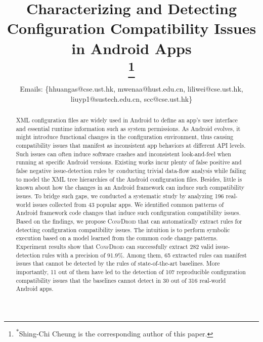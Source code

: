 \documentclass[conference,10pt]{IEEEtran}
\begin{document}
\title{Characterizing and Detecting Configuration Compatibility Issues in Android Apps\\
{}
\thanks{\textsuperscript{$*$}Shing-Chi Cheung is the corresponding author of this paper.}
}
\author{
	Emails: \{hhuangas@cse.ust.hk, mwenaa@hust.edu.cn, liliwei@cse.ust.hk, liuyp1@sustech.edu.cn, scc@cse.ust.hk\}
	}

\maketitle

\begin{abstract}

XML configuration files are widely used in Android to define an app's user interface and essential runtime information such as system permissions.
As Android evolves, it might introduce functional changes in the configuration environment, thus causing compatibility issues that manifest as inconsistent app behaviors at different API levels.
Such issues can often induce software crashes and inconsistent look-and-feel when running at specific Android versions.
Existing works incur plenty of false positive and false negative issue-detection rules by conducting trivial data-flow analysis while failing to model the XML tree hierarchies of the Android configuration files.
Besides, little is known about how the changes in an Android framework can induce such compatibility issues.
To bridge such gaps, we conducted a systematic study by analyzing 196 real-world issues collected from 43 popular apps.
We identified common patterns of Android framework code changes that induce such configuration compatibility issues.
Based on the findings, we propose \textsc{ConfDroid} that can automatically extract rules for detecting configuration compatibility issues.
The intuition is to perform symbolic execution based on a model learned from the common code change patterns.
Experiment results show that \textsc{ConfDroid} can successfully extract 282 valid issue-detection rules with a precision of 91.9\%.
Among them, 65 extracted rules can manifest issues that cannot be detected by the rules of state-of-the-art baselines.
More importantly, 11 out of them have led to the detection of 107 reproducible configuration compatibility issues that the baselines cannot detect in 30 out of 316 real-world Android apps.
\end{abstract}
\end{document}

